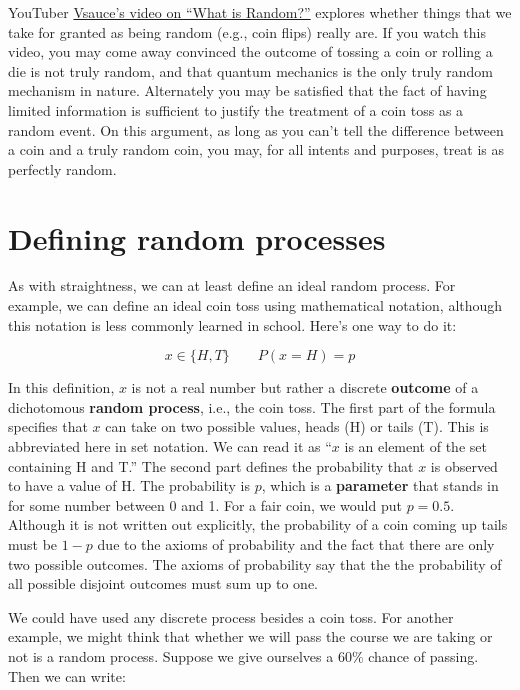 \documentclass[openany]{book}
\begin{document}
YouTuber \href{https://www.youtube.com/watch?v=9rIy0xY99a0}{Vsauce's video on ``What is Random?''} explores whether things that we take for granted as being random (e.g., coin flips) really are. If you watch this video, you may come away convinced the outcome of tossing a coin or rolling a die is not truly random, and that quantum mechanics is the only truly random mechanism in nature. Alternately you may be satisfied that the fact of having limited information is sufficient to justify the treatment of a coin toss as a random event. On this argument, as long as you can't tell the difference between a coin and a truly random coin, you may, for all intents and purposes, treat is as perfectly random.

\hypertarget{defining-random-processes}{%
\section{Defining random processes}\label{defining-random-processes}}

As with straightness, we can at least define an ideal random process. For example, we can define an ideal coin toss using mathematical notation, although this notation is less commonly learned in school. Here's one way to do it:

\[ x \in \{H, T\} \qquad P(x=H) = p\]

In this definition, \(x\) is not a real number but rather a discrete \textbf{outcome} of a dichotomous \textbf{random process}, i.e., the coin toss. The first part of the formula specifies that \(x\) can take on two possible values, heads (H) or tails (T). This is abbreviated here in set notation. We can read it as ``\(x\) is an element of the set containing H and T.'' The second part defines the probability that \(x\) is observed to have a value of H. The probability is \(p\), which is a \textbf{parameter} that stands in for some number between 0 and 1. For a fair coin, we would put \(p=0.5\). Although it is not written out explicitly, the probability of a coin coming up tails must be \(1-p\) due to the axioms of probability and the fact that there are only two possible outcomes. The axioms of probability say that the the probability of all possible disjoint outcomes must sum up to one.

We could have used any discrete process besides a coin toss. For another example, we might think that whether we will pass the course we are taking or not is a random process. Suppose we give ourselves a 60\% chance of passing. Then we can write:
\end{document}
